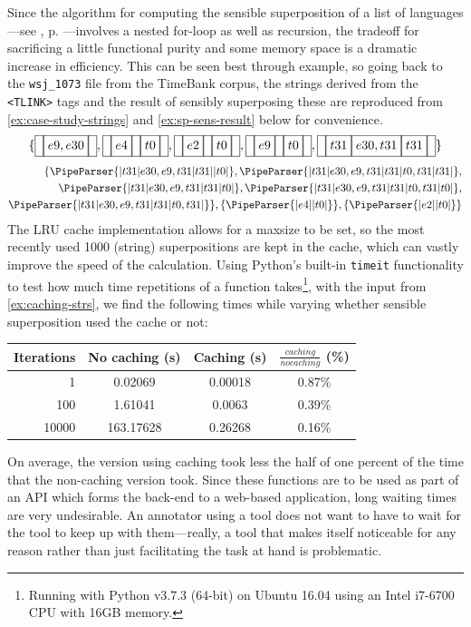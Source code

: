 \documentclass[a4paper,12pt,leqno]{article}
\newcommand{\vph}[1]{\vphantom{#1}}
\newcommand{\ebox}[1]{\fbox{$\vph{'(),}#1$}}
\newcommand{\nbBefore}[2]{\ebox{#1}\ebox{}\ebox{#2}}
\newcommand{\nbDuring}[2]{\ebox{#2}\ebox{#1,#2}\ebox{#2}}
\newcommand{\nbEquals}[2]{\ebox{#1,#2}}
\newcommand{\Before}[2]{\ebox{}\nbBefore{#1}{#2}\ebox{}}
\newcommand{\During}[2]{\ebox{}\nbDuring{#1}{#2}\ebox{}}
\newcommand{\Equals}[2]{\ebox{}\nbEquals{#1}{#2}\ebox{}}
\newcommand{\EventString}[1]{%
	\renewcommand*{\do}[1]{\ebox{##1}}%
	\PipeParser{#1}%
}
\begin{document}
Since the algorithm for computing the sensible superposition of a list of languages---see , p. \pageref{fig:pseudo-code-spsens}---involves a nested for-loop as well as recursion, the tradeoff for sacrificing a little functional purity and some memory space is a dramatic increase in efficiency. This can be seen best through example, so going back to the \verb|wsj_1073| file from the TimeBank corpus, the strings derived from the \verb|<TLINK>| tags and the result of sensibly superposing these are reproduced from \cref{ex:case-study-strings} and \cref{ex:sp-sens-result} below for convenience.
\begin{align}
	\{\Equals{e9}{e30}, \Before{e4}{t0}, \Before{e2}{t0}, \Before{e9}{t0}, \During{e30}{t31}\}\label{ex:caching-strs}
\end{align}
\begin{align}
	\{\EventString{{}|t31|e30,e9,t31|t31|{}|t0|{}}, \EventString{{}|t31|e30,e9,t31|t31|t0,t31|t31|{}},\\
	\EventString{{}|t31|e30,e9,t31|t31|t0|{}}, \EventString{{}|t31|e30,e9,t31|t31|t0,t31|t0|{}},\notag\\
	\EventString{{}|t31|e30,e9,t31|t31|t0,t31|{}}\}, \{\EventString{{}|e4|{}|t0|{}}\}, \{\EventString{{}|e2|{}|t0|{}}\}\notag
\end{align}
The LRU cache implementation allows for a maxsize to be set, so the most recently used 1000 (string) superpositions are kept in the cache, which can vastly improve the speed of the calculation. Using Python's built-in \verb|timeit| functionality to test how much time repetitions of a function takes\footnote{Running with Python v3.7.3 (64-bit) on Ubuntu 16.04 using an Intel i7-6700 CPU with 16GB memory.}, with the input from \cref{ex:caching-strs}, we find the following times while varying whether sensible superposition used the cache or not:
\begin{center}
	\footnotesize
	\begin{tabular}[h!]{|r|c  c  c|}
		\hline
		\textbf{Iterations} & \textbf{No caching (s)} & \textbf{Caching (s)} & $\frac{caching}{no caching}$ (\%)\\
		\hline
		1 & 0.02069 & 0.00018 & 0.87\%\\
		100 & 1.61041 & 0.0063 & 0.39\%\\%
		10000 & 163.17628 & 0.26268 & 0.16\%\\%
		\hline
	\end{tabular}
\end{center}
On average, the version using caching took less the half of one percent of the time that the non-caching version took. Since these functions are to be used as part of an API which forms the back-end to a web-based application, long waiting times are very undesirable. An annotator using a tool does not want to have to wait for the tool to keep up with them---really, a tool that makes itself noticeable for any reason rather than just facilitating the task at hand is problematic.
\end{document}
